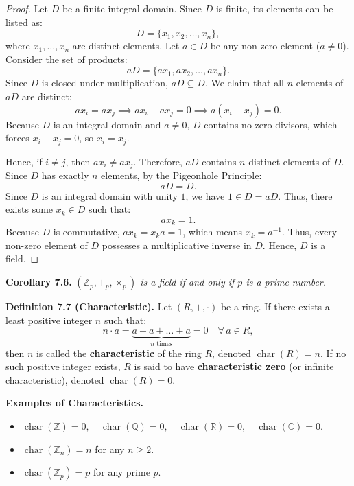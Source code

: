 \documentclass[11pt,a4paper]{article}
\newcommand{\subsectiontitle}[1]{%
  \vspace{1.0em}%
  \noindent{\large\textbf{\color{slateDark}#1}}%
  \vspace{0.25em}\par\nopagebreak%
}
\DeclareMathOperator{\charac}{char}
\begin{document}
\begin{proof}
Let $D$ be a finite integral domain. Since $D$ is finite, its elements can be listed as:
\[
D = \{x_1, x_2, \dots, x_n\},
\]
where $x_1, \dots, x_n$ are distinct elements. Let $a \in D$ be any non-zero element ($a \ne 0$). Consider the set of products:
\[
aD = \{ax_1, ax_2, \dots, ax_n\}.
\]
Since $D$ is closed under multiplication, $aD \subseteq D$. We claim that all $n$ elements of $aD$ are distinct:
\[
ax_i = ax_j \implies ax_i - ax_j = 0 \implies a(x_i - x_j) = 0.
\]
Because $D$ is an integral domain and $a \ne 0$, $D$ contains no zero divisors, which forces $x_i - x_j = 0$, so $x_i = x_j$. 

Hence, if $i \ne j$, then $ax_i \ne ax_j$. Therefore, $aD$ contains $n$ distinct elements of $D$. Since $D$ has exactly $n$ elements, by the Pigeonhole Principle:
\[
aD = D.
\]
Since $D$ is an integral domain with unity $1$, we have $1 \in D = aD$. Thus, there exists some $x_k \in D$ such that:
\[
ax_k = 1.
\]
Because $D$ is commutative, $ax_k = x_k a = 1$, which means $x_k = a^{-1}$. Thus, every non-zero element of $D$ possesses a multiplicative inverse in $D$. Hence, $D$ is a field.
\end{proof}

\begin{thmbox}
\textbf{Corollary 7.6.} \textit{$(\mathbb{Z}_p, +_p, \times_p)$ is a field if and only if $p$ is a prime number.}
\end{thmbox}

\subsectiontitle{Characteristic of a Ring}

\begin{defbox}
\textbf{Definition 7.7 (Characteristic).} Let $(R, +, \cdot)$ be a ring. If there exists a least positive integer $n$ such that:
\[
n \cdot a = \underbrace{a + a + \dots + a}_{n \text{ times}} = 0 \quad \forall\, a \in R,
\]
then $n$ is called the \textbf{characteristic} of the ring $R$, denoted $\charac(R) = n$. If no such positive integer exists, $R$ is said to have \textbf{characteristic zero} (or infinite characteristic), denoted $\charac(R) = 0$.
\end{defbox}

\begin{exbox}
\textbf{Examples of Characteristics.}
\begin{itemize}
    \item $\charac(\mathbb{Z}) = 0, \quad \charac(\mathbb{Q}) = 0, \quad \charac(\mathbb{R}) = 0, \quad \charac(\mathbb{C}) = 0$.
    \item $\charac(\mathbb{Z}_n) = n$ for any $n \ge 2$.
    \item $\charac(\mathbb{Z}_p) = p$ for any prime $p$.
\end{itemize}
\end{exbox}
\end{document}
